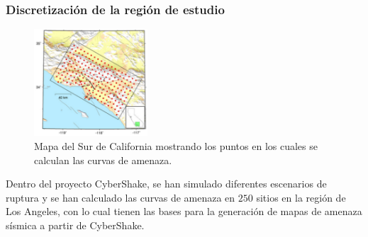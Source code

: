 \documentclass{beamer}
\begin{document}
\begin{frame}%
\frametitle{Discretización de la región de estudio}
%
\justifying
\begin{figure}[h]
	\centering
	\includegraphics[height=4cm]{img/Discretizacion.pdf}
	\caption{Mapa del Sur de California mostrando los puntos en los cuales se calculan las curvas de amenaza. \cite[figura 1, página 3]{gravesetal}}
	\vspace{-.5 cm}
\end{figure}
%
Dentro del proyecto CyberShake, se han simulado diferentes escenarios de ruptura y se han calculado las curvas de amenaza en $250$ sitios en la región de Los Angeles, con lo cual tienen las bases para la generación de mapas de amenaza sísmica a partir de CyberShake.\\
%
%
\end{frame}
%
%
\end{document}
